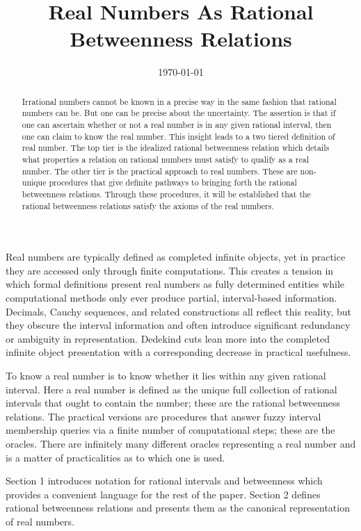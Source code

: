 \documentclass[12pt]{article}
\title{Real Numbers As Rational Betweenness Relations}
\date{\today}
\begin{document}
\maketitle
\begin{abstract}
Irrational numbers cannot be known in a precise way in the same fashion that rational numbers can be. But one can be precise about the uncertainty. The assertion is that if one can ascertain whether or not a real number is in any given rational interval, then one can claim to know the real number. This insight leads to a two tiered definition of real number. The top tier is the idealized rational betweenness relation which details what properties a relation on rational numbers must satisfy to qualify as a real number. The other tier is the practical approach to real numbers. These are non-unique procedures that give definite pathways to bringing forth the rational betweenness relations. Through these procedures, it will be established that the rational betweenness relations satisfy the axioms of the real numbers. 
\end{abstract}


Real numbers are typically defined as completed infinite objects, yet in practice they are accessed only through finite computations. This creates a tension in which formal definitions present real numbers as fully determined entities while computational methods only ever produce partial, interval-based information. Decimals, Cauchy sequences, and related constructions all reflect this reality, but they obscure the interval information and often introduce significant redundancy or ambiguity in representation. Dedekind cuts lean more into the completed infinite object presentation with a corresponding decrease in practical usefulness.

To know a real number is to know whether it lies within any given rational interval. Here a real number is defined as the unique full collection of rational intervals that ought to contain the number; these are the rational betweenness relations. The practical versions are procedures that answer fuzzy interval membership queries via a finite number of computational steps; these are the oracles. There are infinitely many different oracles representing a real number and is a matter of practicalities as to which one is used. 

Section 1 introduces notation for rational intervals and betweenness which provides a convenient language for the rest of the paper. Section 2 defines rational betweenness relations and presents them as the canonical representation of real numbers. 
\end{document}
